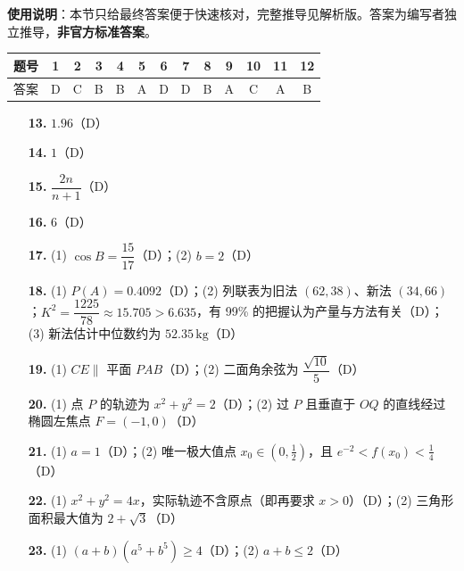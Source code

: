 
\begin{gknotice}
\textbf{使用说明}：本节只给最终答案便于快速核对，完整推导见解析版。答案为编写者独立推导，\textbf{非官方标准答案}。
\end{gknotice}

\begin{center}\begin{tabular}{ccccccccccccc}
\toprule
题号 & 1 & 2 & 3 & 4 & 5 & 6 & 7 & 8 & 9 & 10 & 11 & 12 \\
\midrule
答案 & D & C & B & B & A & D & D & B & A & C & A & B \\
\bottomrule
\end{tabular}\end{center}

\begin{itemize}[leftmargin=2.6em]
  \item[\textbf{13.}] \(1.96\)（D）
  \item[\textbf{14.}] \(1\)（D）
  \item[\textbf{15.}] \(\dfrac{2n}{n+1}\)（D）
  \item[\textbf{16.}] \(6\)（D）
\end{itemize}

\begin{itemize}[leftmargin=2.6em]
  \item[\textbf{17.}] (1) \(\cos B=\dfrac{15}{17}\)（D）；(2) \(b=2\)（D）
  \item[\textbf{18.}] (1) \(P(A)=0.4092\)（D）；(2) 列联表为旧法 \((62,38)\)、新法 \((34,66)\)；\(K^2=\dfrac{1225}{78}\approx15.705>6.635\)，有 99\% 的把握认为产量与方法有关（D）；(3) 新法估计中位数约为 \(52.35\,\mathrm{kg}\)（D）
  \item[\textbf{19.}] (1) \(CE\parallel\) 平面 \(PAB\)（D）；(2) 二面角余弦为 \(\dfrac{\sqrt{10}}5\)（D）
  \item[\textbf{20.}] (1) 点 \(P\) 的轨迹为 \(x^2+y^2=2\)（D）；(2) 过 \(P\) 且垂直于 \(OQ\) 的直线经过椭圆左焦点 \(F=(-1,0)\)（D）
  \item[\textbf{21.}] (1) \(a=1\)（D）；(2) 唯一极大值点 \(x_0\in(0,\tfrac12)\)，且 \(e^{-2}<f(x_0)<\tfrac14\)（D）
  \item[\textbf{22.}] (1) \(x^2+y^2=4x\)，实际轨迹不含原点（即再要求 \(x>0\)）（D）；(2) 三角形面积最大值为 \(2+\sqrt3\)（D）
  \item[\textbf{23.}] (1) \((a+b)(a^5+b^5)\ge4\)（D）；(2) \(a+b\le2\)（D）
\end{itemize}
